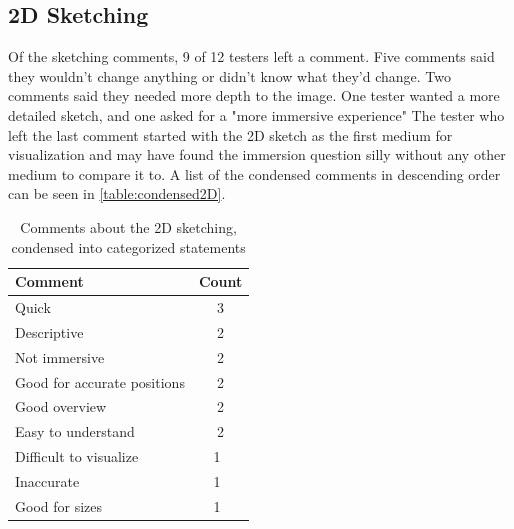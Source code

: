 \subsection*{2D Sketching}
	Of the sketching comments, 9 of 12 testers left a comment. Five comments said they wouldn't change anything or didn't know what they'd change. Two comments said they needed more depth to the image. One tester wanted a more detailed sketch, and one asked for a "more immersive experience" The tester who left the last comment started with the 2D sketch as the first medium for visualization and may have found the immersion question silly without any other medium to compare it to. A list of the condensed comments in descending order can be seen in \autoref{table:condensed2D}.
	\begin{table}[H]
		\centering
		\caption{Comments about the 2D sketching, condensed into categorized statements}
		\label{table:condensed2D}
		\begin{tabular}{p{5cm}|c}
			Comment & Count \\ \hline
			Quick & 3 \\
			Descriptive & 2\\
			Not immersive & 2 \\
			Good for accurate positions & 2 \\
			Good overview  & 2 \\
			Easy to understand & 2 \\
			Difficult to visualize & 1 \\
			Inaccurate& 1 \\
			Good for sizes & 1 \\
		\end{tabular}
	\end{table}
